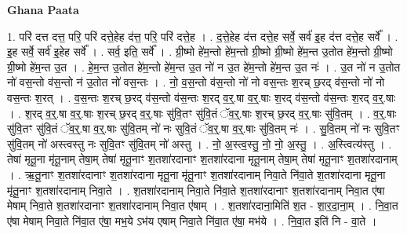 \documentclass[17pt]{extarticle}
\begin{document}
\textbf{Ghana Paata } \newline

1. परि॑ दत्त दत्त॒ परि॒ परि॑ दत्ते॒हेह द॑त्त॒ परि॒ परि॑ दत्ते॒ह । . द॒त्ते॒हेह द॑त्त दत्ते॒ह सर्वे॒ सर्व॑ इ॒ह द॑त्त दत्ते॒ह सर्वे᳚ । . इ॒ह सर्वे॒ सर्व॑ इ॒हेह सर्वे᳚ । . सर्व॒ इति॒ सर्वे᳚ । . ग्री॒ष्मो हे॑म॒न्तो हे॑म॒न्तो ग्री॒ष्मो ग्री॒ष्मो हे॑म॒न्त उ॒तोत हे॑म॒न्तो ग्री॒ष्मो ग्री॒ष्मो हे॑म॒न्त उ॒त । . हे॒म॒न्त उ॒तोत हे॑म॒न्तो हे॑म॒न्त उ॒त नो॑ न उ॒त हे॑म॒न्तो हे॑म॒न्त उ॒त नः॑ । . उ॒त नो॑ न उ॒तोत नो॑ वस॒न्तो व॑स॒न्तो न॑ उ॒तोत नो॑ वस॒न्तः । . नो॒ व॒स॒न्तो व॑स॒न्तो नो॑ नो वस॒न्तः श॒रच् छ॒रद् व॑स॒न्तो नो॑ नो वस॒न्तः श॒रत् । . व॒स॒न्तः श॒रच् छ॒रद् व॑स॒न्तो व॑स॒न्तः श॒रद् व॒र्॒.षा व॒र्॒.षाः श॒रद् व॑स॒न्तो व॑स॒न्तः श॒रद् व॒र्॒.षाः । . श॒रद् व॒र्॒.षा व॒र्॒.षाः श॒रच् छ॒रद् व॒र्॒.षाः सु॑वि॒तꣳ सु॑वि॒तं ॅव॒र्॒.षाः श॒रच् छ॒रद् व॒र्॒.षाः सु॑वि॒तम् । . व॒र्॒.षाः सु॑वि॒तꣳ सु॑वि॒तं ॅव॒र्॒.षा व॒र्॒.षाः सु॑वि॒तम् नो॑ नः सुवि॒तं ॅव॒र्॒.षा व॒र्॒.षाः सु॑वि॒तम् नः॑ । . सु॒वि॒तम् नो॑ नः सुवि॒तꣳ सु॑वि॒तम् नो॑ अस्त्वस्तु नः सुवि॒तꣳ सु॑वि॒तम् नो॑ अस्तु । . नो॒ अ॒स्त्व॒स्तु॒ नो॒ नो॒ अ॒स्तु॒ । . अ॒स्त्वित्य॑स्तु । . तेषा॑ मृतू॒ना मृ॑तू॒नाम् तेषा॒म् तेषा॑ मृतू॒नाꣳ श॒तशा॑रदानाꣳ श॒तशा॑रदाना मृतू॒नाम् तेषा॒म् तेषा॑ मृतू॒नाꣳ श॒तशा॑रदानाम् । . ऋ॒तू॒नाꣳ श॒तशा॑रदानाꣳ श॒तशा॑रदाना मृतू॒ना मृ॑तू॒नाꣳ श॒तशा॑रदानाम् निवा॒ते नि॑वा॒ते श॒तशा॑रदाना मृतू॒ना मृ॑तू॒नाꣳ श॒तशा॑रदानाम् निवा॒ते । . श॒तशा॑रदानाम् निवा॒ते नि॑वा॒ते श॒तशा॑रदानाꣳ श॒तशा॑रदानाम् निवा॒त ए॑षा मेषाम् निवा॒ते श॒तशा॑रदानाꣳ श॒तशा॑रदानाम् निवा॒त ए॑षाम् । . श॒तशा॑रदाना॒मिति॑ श॒त - शा॒र॒दा॒ना॒म् । . नि॒वा॒त ए॑षा मेषाम् निवा॒ते नि॑वा॒त ए॑षा॒ मभ॒ये ऽभ॑य एषाम् निवा॒ते नि॑वा॒त ए॑षा॒ मभ॑ये । . नि॒वा॒त इति॑ नि - वा॒ते । \newline
\end{document}
